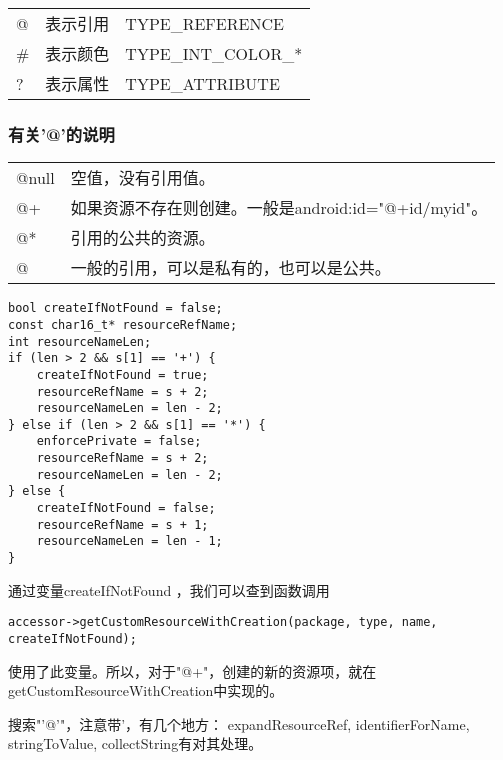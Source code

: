 \documentclass[a4paper,11pt]{article}
\begin{document}
\begin{tabular}{lll}
@  & 表示引用 & TYPE_REFERENCE\\
\# & 表示颜色 & TYPE_INT_COLOR_*\\
? & 表示属性 & TYPE_ATTRIBUTE\\
\end{tabular}

\subsubsection{有关'@'的说明}
\begin{tabular}{ll}
@null & 空值，没有引用值。\\
@+ & 如果资源不存在则创建。一般是android:id="@+id/myid"。\\
@* & 引用的公共的资源。\\
@  & 一般的引用，可以是私有的，也可以是公共。\\
\end{tabular}

\begin{lstlisting}[caption={stringToValue对@的处理代码},label=aterisk,]
bool createIfNotFound = false;
const char16_t* resourceRefName;
int resourceNameLen;
if (len > 2 && s[1] == '+') {
    createIfNotFound = true;
    resourceRefName = s + 2;
    resourceNameLen = len - 2;
} else if (len > 2 && s[1] == '*') {
    enforcePrivate = false;
    resourceRefName = s + 2;
    resourceNameLen = len - 2;
} else {
    createIfNotFound = false;
    resourceRefName = s + 1;
    resourceNameLen = len - 1;
}
\end{lstlisting}

通过变量createIfNotFound ，我们可以查到函数调用
\begin{lstlisting}
accessor->getCustomResourceWithCreation(package, type, name, createIfNotFound);
\end{lstlisting}
使用了此变量。所以，对于"@+"，创建的新的资源项，就在getCustomResourceWithCreation中实现的。

搜索"'@'"，注意带'，有几个地方：
expandResourceRef, identifierForName, stringToValue, collectString有对其处理。
\end{document}
